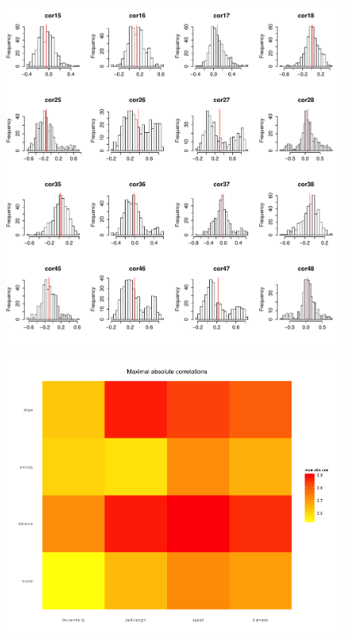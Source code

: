 \documentclass{article}
\begin{document}
\begin{figure}[h!]
\begin{minipage}{0.55\linewidth}
\includegraphics[width=\textwidth]{hist_crossCorMat_breaks30}
\end{minipage}
\begin{minipage}{0.34\linewidth}
\includegraphics[width=\textwidth]{heatmap_maxAbsCor}\\

\end{minipage}
\end{figure}
\end{document}
